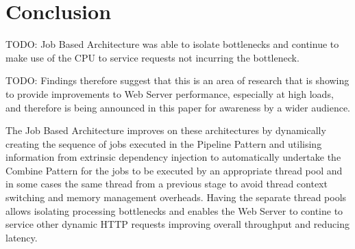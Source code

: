 \documentclass[conference]{ieee/IEEEtran}
\begin{document}
%





\section{Conclusion}
TODO: Job Based Architecture was able to isolate bottlenecks and continue to
make use of the CPU to service requests not incurring the bottleneck.

TODO: Findings therefore suggest that this is an area of research that is
showing to provide improvements to Web Server performance, especially at high
loads, and therefore is being announced in this paper for awareness by a wider
audience.

The Job Based Architecture improves on these architectures by dynamically
creating the sequence of jobs executed in the Pipeline Pattern and utilising
information from extrinsic dependency injection to automatically undertake the
Combine Pattern for the jobs to be executed by an appropriate thread pool and
in some cases the same thread from a previous stage to avoid thread context
switching and memory management overheads.  Having the separate thread pools
allows isolating processing bottlenecks and enables the Web Server to contine
to service other dynamic HTTP requests improving overall throughput and
reducing latency.
\end{document}
